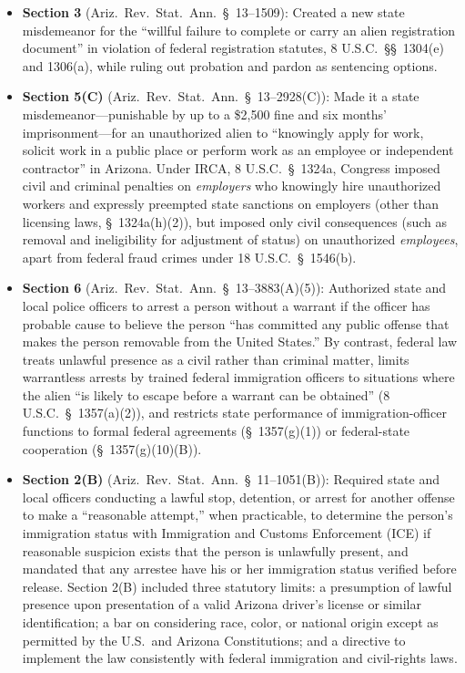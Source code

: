 \documentclass[12pt]{article}
\begin{document}
\begin{itemize}
\item \textbf{Section 3} (Ariz.\ Rev.\ Stat.\ Ann.\ \S~13--1509): Created a new state misdemeanor for the ``willful failure to complete or carry an alien registration document'' in violation of federal registration statutes, 8 U.S.C.\ \S\S~1304(e) and 1306(a), while ruling out probation and pardon as sentencing options.
\item \textbf{Section 5(C)} (Ariz.\ Rev.\ Stat.\ Ann.\ \S~13--2928(C)): Made it a state misdemeanor---punishable by up to a \$2,500 fine and six months' imprisonment---for an unauthorized alien to ``knowingly apply for work, solicit work in a public place or perform work as an employee or independent contractor'' in Arizona. Under IRCA, 8 U.S.C.\ \S~1324a, Congress imposed civil and criminal penalties on \textit{employers} who knowingly hire unauthorized workers and expressly preempted state sanctions on employers (other than licensing laws, \S~1324a(h)(2)), but imposed only civil consequences (such as removal and ineligibility for adjustment of status) on unauthorized \textit{employees}, apart from federal fraud crimes under 18 U.S.C.\ \S~1546(b).
\item \textbf{Section 6} (Ariz.\ Rev.\ Stat.\ Ann.\ \S~13--3883(A)(5)): Authorized state and local police officers to arrest a person without a warrant if the officer has probable cause to believe the person ``has committed any public offense that makes the person removable from the United States.'' By contrast, federal law treats unlawful presence as a civil rather than criminal matter, limits warrantless arrests by trained federal immigration officers to situations where the alien ``is likely to escape before a warrant can be obtained'' (8 U.S.C.\ \S~1357(a)(2)), and restricts state performance of immigration-officer functions to formal federal agreements (\S~1357(g)(1)) or federal-state cooperation (\S~1357(g)(10)(B)).
\item \textbf{Section 2(B)} (Ariz.\ Rev.\ Stat.\ Ann.\ \S~11--1051(B)): Required state and local officers conducting a lawful stop, detention, or arrest for another offense to make a ``reasonable attempt,'' when practicable, to determine the person's immigration status with Immigration and Customs Enforcement (ICE) if reasonable suspicion exists that the person is unlawfully present, and mandated that any arrestee have his or her immigration status verified before release. Section 2(B) included three statutory limits: a presumption of lawful presence upon presentation of a valid Arizona driver's license or similar identification; a bar on considering race, color, or national origin except as permitted by the U.S.\ and Arizona Constitutions; and a directive to implement the law consistently with federal immigration and civil-rights laws.
\end{itemize}
\end{document}
